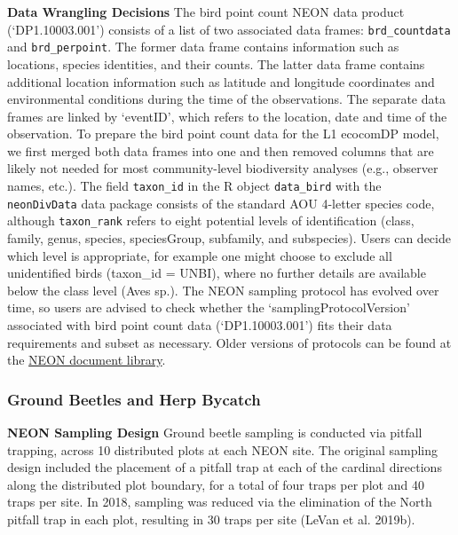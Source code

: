 \documentclass[
  12pt,
]{article}
\begin{document}
\textbf{Data Wrangling Decisions} The bird point count NEON data product (`DP1.10003.001') consists of a list of two associated data frames: \texttt{brd\_countdata} and \texttt{brd\_perpoint}. The former data frame contains information such as locations, species identities, and their counts. The latter data frame contains additional location information such as latitude and longitude coordinates and environmental conditions during the time of the observations. The separate data frames are linked by `eventID', which refers to the location, date and time of the observation. To prepare the bird point count data for the L1 ecocomDP model, we first merged both data frames into one and then removed columns that are likely not needed for most community-level biodiversity analyses (e.g., observer names, etc.). The field \texttt{taxon\_id} in the R object \texttt{data\_bird} with the \texttt{neonDivData} data package consists of the standard AOU 4-letter species code, although \texttt{taxon\_rank} refers to eight potential levels of identification (class, family, genus, species, speciesGroup, subfamily, and subspecies). Users can decide which level is appropriate, for example one might choose to exclude all unidentified birds (taxon\_id = UNBI), where no further details are available below the class level (Aves sp.). The NEON sampling protocol has evolved over time, so users are advised to check whether the `samplingProtocolVersion' associated with bird point count data (`DP1.10003.001') fits their data requirements and subset as necessary. Older versions of protocols can be found at the \href{https://data.neonscience.org/documents/-/document_library_display/JEygRkSpUBoq/view/1883155?_110_INSTANCE_JEygRkSpUBoq_topLink=home\&_110_INSTANCE_JEygRkSpUBoq_delta1=20\&_110_INSTANCE_JEygRkSpUBoq_keywords=\&_110_INSTANCE_JEygRkSpUBoq_advancedSearch=false\&_110_INSTANCE_JEygRkSpUBoq_andOperator=true\&p_r_p_564233524_resetCur=false\&_110_INSTANCE_JEygRkSpUBoq_delta2=20\&_110_INSTANCE_JEygRkSpUBoq_cur2=1}{NEON document library}.

\hypertarget{ground-beetles-and-herp-bycatch}{%
\subsubsection{Ground Beetles and Herp Bycatch}\label{ground-beetles-and-herp-bycatch}}

\textbf{NEON Sampling Design} Ground beetle sampling is conducted via pitfall trapping, across 10 distributed plots at each NEON site. The original sampling design included the placement of a pitfall trap at each of the cardinal directions along the distributed plot boundary, for a total of four traps per plot and 40 traps per site. In 2018, sampling was reduced via the elimination of the North pitfall trap in each plot, resulting in 30 traps per site (LeVan et al. 2019b).
\end{document}
